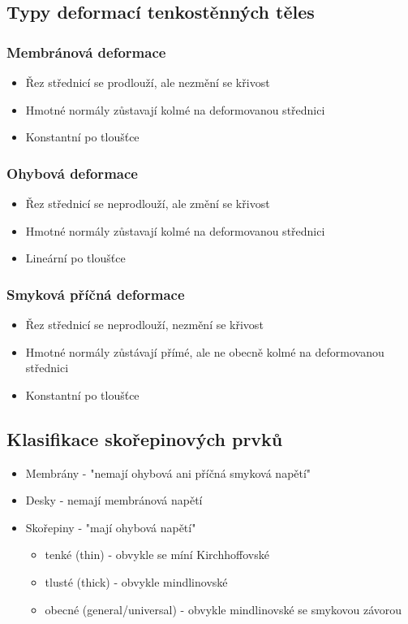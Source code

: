 \documentclass[10pt,oneside]{article}
\begin{document}
\subsection*{Typy deformací tenkostěnných těles}

\subsubsection*{Membránová deformace}
\begin{itemize}
	\item Řez střednicí se prodlouží, ale nezmění se křivost
	\item Hmotné normály zůstavají kolmé na deformovanou střednici
	\item Konstantní po tloušťce
\end{itemize}

\subsubsection*{Ohybová deformace}
\begin{itemize}
	\item Řez střednicí se neprodlouží, ale změní se křivost
	\item Hmotné normály zůstavají kolmé na deformovanou střednici
	\item Lineární po tloušťce
\end{itemize}

\subsubsection*{Smyková příčná deformace}
\begin{itemize}
	\item Řez střednicí se neprodlouží, nezmění se křivost
	\item Hmotné normály zůstávají přímé, ale ne obecně kolmé na deformovanou střednici
	\item Konstantní po tloušťce
\end{itemize}

\subsection*{Klasifikace skořepinových prvků}
\begin{itemize}
\item Membrány - "nemají ohybová ani příčná smyková napětí"
\item Desky - nemají membránová napětí
\item Skořepiny - "mají ohybová napětí"
	\begin{itemize}
	\item tenké (thin) - obvykle se míní Kirchhoffovské
	\item tlusté (thick) - obvykle mindlinovské
	\item obecné (general/universal) - obvykle mindlinovské se smykovou závorou
	\end{itemize}
\end{itemize}
\end{document}
